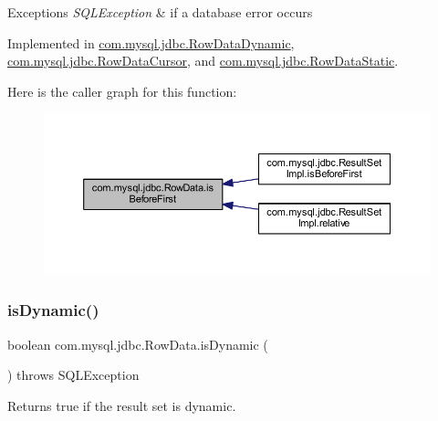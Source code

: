 \begin{DoxyExceptions}{Exceptions}
{\em S\+Q\+L\+Exception} & if a database error occurs \\
\hline
\end{DoxyExceptions}


Implemented in \mbox{\hyperlink{classcom_1_1mysql_1_1jdbc_1_1_row_data_dynamic_a6cfc796696d9202761004405808df049}{com.\+mysql.\+jdbc.\+Row\+Data\+Dynamic}}, \mbox{\hyperlink{classcom_1_1mysql_1_1jdbc_1_1_row_data_cursor_a1c63929717c789969a16960cc340bdad}{com.\+mysql.\+jdbc.\+Row\+Data\+Cursor}}, and \mbox{\hyperlink{classcom_1_1mysql_1_1jdbc_1_1_row_data_static_acd81997ad7a1cfc35fbd6e066dd42525}{com.\+mysql.\+jdbc.\+Row\+Data\+Static}}.

Here is the caller graph for this function\+:
\nopagebreak
\begin{figure}[H]
\begin{center}
\leavevmode
\includegraphics[width=350pt]{interfacecom_1_1mysql_1_1jdbc_1_1_row_data_ae315d5317b29387492173d1e808b65d5_icgraph}
\end{center}
\end{figure}
\mbox{\label{interfacecom_1_1mysql_1_1jdbc_1_1_row_data_a0205c4297c795afb968d714a56272e01}} 
\subsubsection{\texorpdfstring{is\+Dynamic()}{isDynamic()}}
{\footnotesize\ttfamily boolean com.\+mysql.\+jdbc.\+Row\+Data.\+is\+Dynamic (\begin{DoxyParamCaption}{ }\end{DoxyParamCaption}) throws S\+Q\+L\+Exception}

Returns true if the result set is dynamic.

